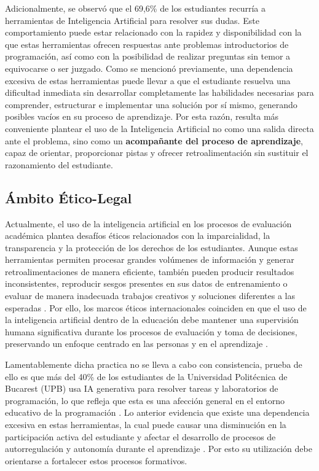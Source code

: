 \documentclass[letterpaper, 10 pt, conference]{ieeeconf}
\begin{document}
Adicionalmente, se observó que el 69,6\% de los estudiantes recurría a herramientas de Inteligencia Artificial para resolver sus dudas. Este comportamiento puede estar relacionado con la rapidez y disponibilidad con la que estas herramientas ofrecen respuestas ante problemas introductorios de programación, así como con la posibilidad de realizar preguntas sin temor a equivocarse o ser juzgado. Como se mencionó previamente, una dependencia excesiva de estas herramientas puede llevar a que el estudiante resuelva una dificultad inmediata sin desarrollar completamente las habilidades necesarias para comprender, estructurar e implementar una solución por sí mismo, generando posibles vacíos en su proceso de aprendizaje. Por esta razón, resulta más conveniente plantear el uso de la Inteligencia Artificial no como una salida directa ante el problema, sino como un \textbf{acompañante del proceso de aprendizaje}, capaz de orientar, proporcionar pistas y ofrecer retroalimentación sin sustituir el razonamiento del estudiante.


\subsection{Ámbito Ético-Legal}  


Actualmente, el uso de la inteligencia artificial en los procesos de evaluación académica plantea desafíos éticos relacionados con la imparcialidad, la transparencia y la protección de los derechos de los estudiantes. Aunque estas herramientas permiten procesar grandes volúmenes de información y generar retroalimentaciones de manera eficiente, también pueden producir resultados inconsistentes, reproducir sesgos presentes en sus datos de entrenamiento o evaluar de manera inadecuada trabajos creativos y soluciones diferentes a las esperadas \cite{8}. Por ello, los marcos éticos internacionales coinciden en que el uso de la inteligencia artificial dentro de la educación debe mantener una supervisión humana significativa durante los procesos de evaluación y toma de decisiones, preservando un enfoque centrado en las personas y en el aprendizaje \cite{4}.

Lamentablemente dicha practica no se lleva a cabo con consistencia, prueba de ello es que más del 40\% de los estudiantes de la Universidad Politécnica de Bucarest (UPB) usa IA generativa para resolver tareas y laboratorios de programación, lo que refleja que esta es una afección general en el entorno educativo de la programación \cite{22}. Lo anterior evidencia que existe una dependencia excesiva en estas herramientas, la cual puede causar una disminución en la participación activa del estudiante y afectar el desarrollo de procesos de autorregulación y autonomía durante el aprendizaje \cite{4}. Por esto su utilización debe orientarse a fortalecer estos procesos formativos.
\end{document}
